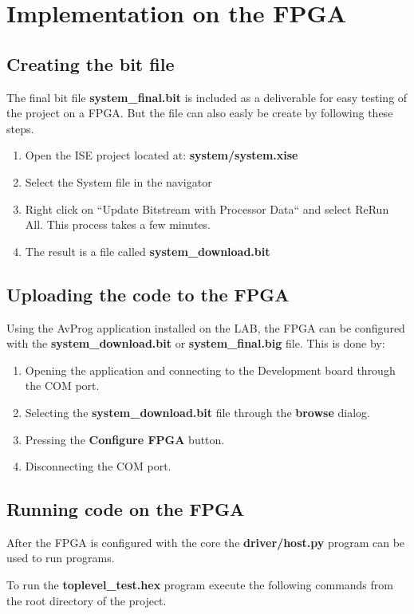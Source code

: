 \section{Implementation on the FPGA}

\subsection{Creating the bit file}
The final bit file {\bf system\_final.bit} is included as a deliverable for easy testing of the project on a FPGA. But the file can also easly be create by following these steps.


\begin{enumerate}
	\item Open the ISE project located at:
		{\bf system/system.xise}
	\item Select the System file in the navigator
  \item Right click on ``Update Bitstream with Processor Data`` and select ReRun All. This process takes a few minutes. 
	\item The result is a file called {\bf system\_download.bit}
\end{enumerate}


\subsection{Uploading the code to the FPGA}
Using the AvProg application installed on the LAB, the FPGA can be configured with the {\bf system\_download.bit} or {\bf system\_final.big} file.
This is done by:

\begin{enumerate}
\item Opening the application and connecting to the Development board through the COM port.
\item Selecting the {\bf system\_download.bit} file through the {\bf browse} dialog. 
\item Pressing the {\bf Configure FPGA} button.
\item Disconnecting the COM port. 
\end{enumerate}  

\subsection{Running code on the FPGA}
After the FPGA is configured with the core the {\bf driver/host.py} program can be used to run programs.

To run the {\bf toplevel\_test.hex} program execute the following commands from the root directory of the project.

